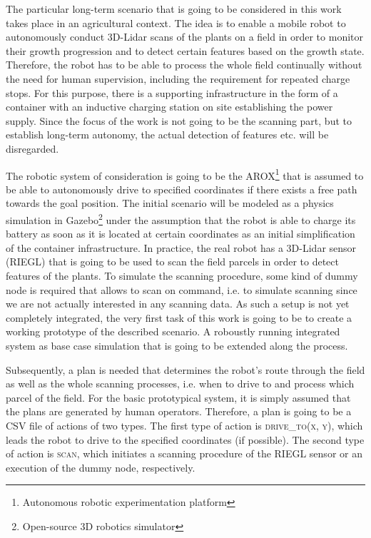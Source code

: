 \documentclass[german, master, expose, latin1]{base/thesis_KBS}
\begin{document}
The particular long-term scenario that is going to be considered in this work takes place in an agricultural context.
The idea is to enable a mobile robot to autonomously conduct 3D-Lidar scans of the plants on a field in order to monitor their growth progression and 
to detect certain features based on the growth state. Therefore, the robot has to be able to process the whole field continually without the need for human supervision,
including the requirement for repeated charge stops. For this purpose, there is a supporting infrastructure in the form of a container with an inductive charging station on site
establishing the power supply. Since the focus of the work is not going to be the scanning part, but to establish long-term autonomy, 
the actual detection of features etc. will be disregarded.\newline

The robotic system of consideration is going to be the AROX\footnote{Autonomous robotic experimentation platform} that is assumed to be able to autonomously drive to specified
coordinates if there exists a free path towards the goal position. The initial scenario will be modeled as a physics simulation in Gazebo\footnote{Open-source 3D robotics simulator} 
under the assumption that the robot is able to charge its battery as soon as it is located at certain coordinates as an initial simplification of the container infrastructure.
In practice, the real robot has a 3D-Lidar sensor (RIEGL) that is going to be used to scan the field parcels in order to detect features of the plants.
To simulate the scanning procedure, some kind of dummy node is required that allows to scan on command, i.e. to simulate scanning since we are not actually
interested in any scanning data. As such a setup is not yet completely integrated, the very first task of this work is going to be to create a working prototype of
the described scenario. A roboustly running integrated system as base case simulation that is going to be extended along the process.\newline

Subsequently, a plan is needed that determines the robot's route through the field as well as the whole scanning processes, i.e. when to drive to and process which parcel of the field.
For the basic prototypical system, it is simply assumed that the plans are generated by human operators. Therefore, a plan is going to be a CSV file of actions of two types.
The first type of action is \textsc{drive\_to(x, y)}, which leads the robot to drive to the specified coordinates (if possible). The second type of action is \textsc{scan},
which initiates a scanning procedure of the RIEGL sensor or an execution of the dummy node, respectively.\newline
\end{document}
